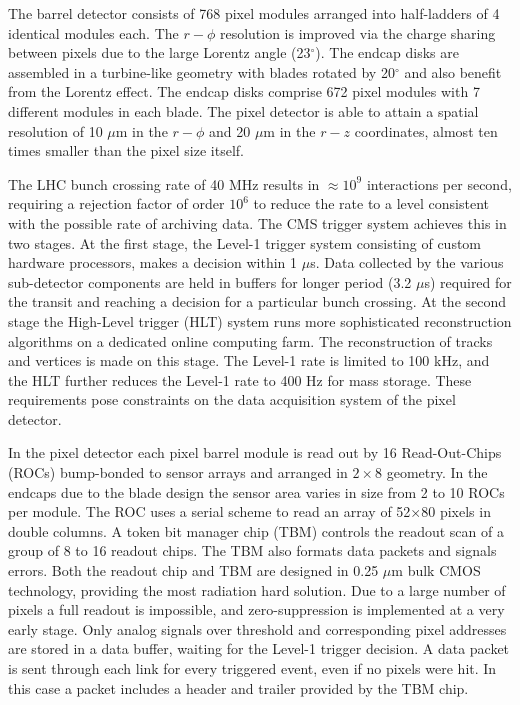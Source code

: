 The barrel detector consists of 768 pixel modules arranged into 
half-ladders of 4 identical modules
each. The $r-\phi$ resolution is improved via the charge sharing between 
pixels due to 
the large Lorentz angle (23$^\circ$).
The endcap disks are assembled in a turbine-like geometry with blades 
rotated by 20$^\circ$
and also benefit from the Lorentz effect. The endcap disks comprise 672 
pixel modules 
with 7 different modules in each blade.
The pixel detector is able to attain a spatial 
resolution of 10 $\mu$m in the $r-\phi$ and 20 $\mu$m in the $r-z$ 
coordinates, 
almost ten times smaller than the pixel size itself.

The LHC bunch crossing rate of 40 MHz results in $\approx 10^9$ 
interactions per second, 
requiring a rejection factor of order $10^6$ to reduce the rate to a level 
consistent 
with the possible rate of archiving data. The CMS trigger system achieves 
this in two stages. 
At the first stage, the Level-1 trigger system consisting of custom 
hardware processors,
makes a decision within 1 $\mu$s. 
Data collected by the various sub-detector components are held in buffers 
for longer period (3.2 $\mu$s)
required for the transit and reaching a decision for a particular bunch 
crossing. 
At the second stage the High-Level trigger (HLT) system 
runs more sophisticated reconstruction algorithms on a dedicated online 
computing farm. 
The reconstruction of tracks and vertices is made on this stage.
The Level-1 rate is limited to 100 kHz, and the HLT further reduces the 
Level-1 rate to 400 Hz 
for mass storage. These requirements pose constraints on the data 
acquisition system of the pixel 
detector.

In the pixel detector 
each pixel barrel module is read out by 16 Read-Out-Chips (ROCs)
bump-bonded to sensor arrays and 
arranged in $2\times8$ geometry.
In the endcaps due to the blade design the sensor area varies  in size 
from 2 to 10 ROCs per module.
The ROC uses a serial scheme to read an array of 52$\times$80 pixels in 
double columns.
A token bit manager chip (TBM) controls the readout scan of a group of 8 
to 16 readout chips.
The TBM also formats data packets and signals errors.  
Both the readout chip and TBM are designed in 0.25 $\mu$m bulk CMOS 
technology, 
providing the most radiation hard solution.
Due to a large number of pixels a full readout is impossible, and 
zero-suppression 
is implemented at a very early stage.
Only analog signals over threshold and corresponding pixel addresses are 
stored in a data buffer, 
waiting for the Level-1 trigger decision. 
A data packet is sent through each link for every triggered event, even if 
no pixels were hit.
In this case a packet includes a header and trailer provided by the TBM 
chip. 

